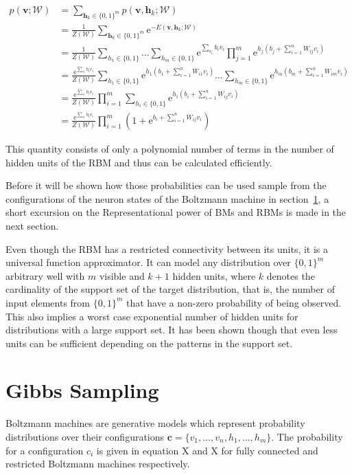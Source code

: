 \begin{align}
   p(\bm{v};\mathcal{W}) &= \sum_{\bm{h}_k \in \{0,1\}^m} p(\bm{v},\bm{h}_k;\mathcal{W})\\
   &= \frac{1}{Z(\mathcal{W})}\sum_{\bm{h}_k \in \{0,1\}^m} \mathrm{e}^{-E(\bm{v}, \bm{h}_k;\mathcal{W})}\\
   &= \frac{1}{Z(\mathcal{W})}\sum_{h_1\in \{0,1\}}\dots\sum_{h_m \in \{0,1\}}\mathrm{e}^{\sum_{v_i}b_iv_i}\prod_{j=1}^m\mathrm{e}^{h_j(b_j + \sum_{i=1}^nW_{ij}v_i)}\\
   &= \frac{\mathrm{e}^{\sum_{v_i}b_iv_i}}{Z(\mathcal{W})}\sum_{h_1 \in \{0,1\}}\mathrm{e}^{h_1(b_1 + \sum_{i=1}^nW_{i1}v_i)}\dots\sum_{h_m \in \{0,1\}}\mathrm{e}^{h_m(b_m + \sum_{i=1}^nW_{im}v_i)}\\
   &= \frac{\mathrm{e}^{\sum_{v_i}b_iv_i}}{Z(\mathcal{W})}\prod_{i=1}^m\sum_{h_i \in \{0,1\}}\mathrm{e}^{h_i(b_i + \sum_{i=1}^nW_{ij}v_i)}\\
   &= \frac{\mathrm{e}^{\sum_{v_i}b_iv_i}}{Z(\mathcal{W})}\prod_{i=1}^m(1+\mathrm{e}^{b_i + \sum_{i=1}^nW_{ij}v_i})
\end{align}

This quantity consists of only a polynomial number of terms in the number of hidden units of the RBM and 
thus can be calculated efficiently.

Before it will be shown how those probabilities can be used sample from the configurations of the neuron states
of the Boltzmann machine in section~\ref{sec:gibbsSampling}, a short excursion on the Representational power 
of BMs and RBMs is made in the next section.

Even though the RBM has a restricted connectivity between its units, it is a universal function approximator.
It can model any distribution over $\{0,1\}^m$ arbitrary well with $m$ visible and $k+1$ hidden units, where 
$k$ denotes the cardinality of the support set of the target distribution, that is, the number of input elements
from $\{0,1\}^m$ that have a non-zero probability of being observed. This also implies a worst case 
exponential number of hidden units for distributions with a large support set. It has been shown though 
that even less units can be sufficient depending on the patterns in the support set.

\section{Gibbs Sampling}
\label{sec:gibbsSampling}

Boltzmann machines are generative models which represent probability distributions over their 
configurations $\bm{c} = \{v_1,\dots,v_n,h_1, \dots, h_m\}$. The probability for a configuration 
$c_i$ is given in equation X and X for fully connected and restricted Boltzmann machines respectively.


